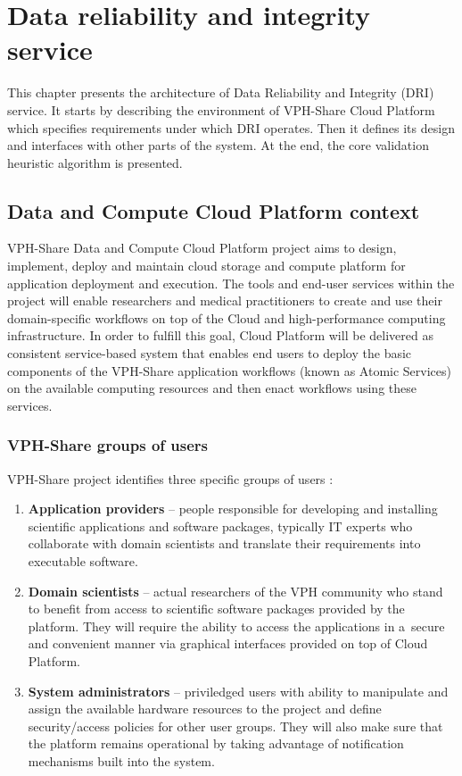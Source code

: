 \chapter{Data reliability and integrity service}
\label{cha:architecture}
This chapter presents the architecture of Data Reliability and Integrity (DRI)
service. It starts by describing the environment of VPH-Share Cloud Platform 
which specifies requirements under which DRI operates. Then it defines its 
design and interfaces with other parts of the system. At the end, the core 
validation heuristic algorithm is presented.

\section{Data and Compute Cloud Platform context}
\label{cloud-platform}
VPH-Share Data and Compute Cloud Platform project aims to design, implement,
deploy and maintain cloud storage and compute platform for application deployment
and execution. The tools and end-user services within the project will enable
researchers and medical practitioners to create and use their domain-specific
workflows on top of the Cloud and high-performance computing infrastructure.
In order to fulfill this goal, Cloud Platform will be delivered as consistent
service-based system that enables end users to deploy the basic components of
the VPH-Share application workflows (known as Atomic Services) on the available
computing resources and then enact workflows using these services.

\subsection{VPH-Share groups of users}
\label{vph-users}
VPH-Share project identifies three specific groups of users \cite{vph-deliverable-2-2}:

\begin{enumerate}
\item \textbf{Application providers} -- people responsible for developing and
installing scientific applications and software packages, typically IT experts
who collaborate with domain scientists and translate their requirements into
executable software.
\item \textbf{Domain scientists} -- actual researchers of the VPH community who
stand to benefit from access to scientific software packages provided by the 
platform. They will require the ability to access the applications in a~secure
and convenient manner via graphical interfaces provided on top of Cloud Platform.
\item \textbf{System administrators} -- priviledged users with ability to manipulate
and assign the available hardware resources to the project and define security/access
policies for other user groups. They will also make sure that the platform remains
operational by taking advantage of notification mechanisms built into the system.
\end{enumerate}

